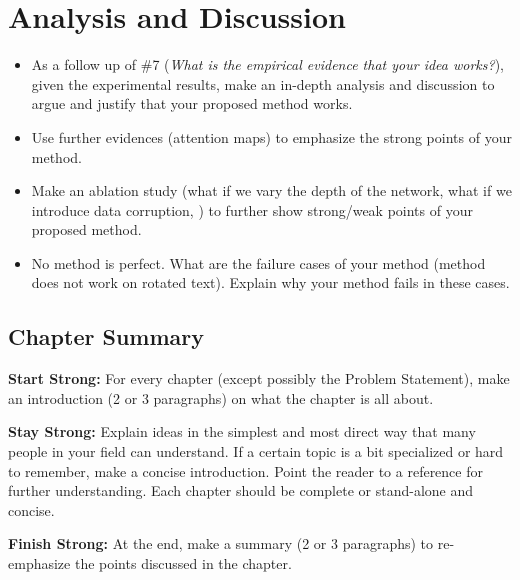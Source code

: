 \chapter{Analysis and Discussion}
\label{ch:analysis}

\begin{itemize}
    \item As a follow up of \#7 (\emph{What is the empirical evidence that your idea works?}), given the experimental results, make an in-depth analysis and discussion to argue and justify that your proposed method works.
    \item Use further evidences (\eg attention maps) to emphasize the strong points of your method.
    \item Make an ablation study (\eg what if we vary the depth of the network, what if we introduce data corruption, \etc) to further show strong/weak points of your proposed method.
    \item No method is perfect. What are the failure cases of your method (\eg method does not work on rotated text). Explain why your method fails in these cases.
\end{itemize}

\section{Chapter Summary}

\textbf{Start Strong:} For every chapter (except possibly the Problem Statement), make an introduction (2 or 3 paragraphs) on what the chapter is all about.

\textbf{Stay Strong:} Explain ideas in the simplest and most direct way that many people in your field can understand. If a certain topic is a bit specialized or hard to remember, make a concise introduction. Point the reader to a reference for further understanding. Each chapter should be complete or stand-alone and concise.

\textbf{Finish Strong:} At the end, make a summary (2 or 3 paragraphs) to re-emphasize the points discussed in the chapter.
